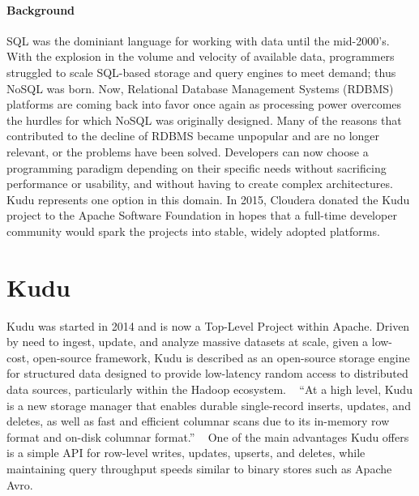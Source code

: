 \paragraph{Background}
SQL was the dominiant language for working with data until the
mid-2000's.  With the explosion in the volume and velocity of
available data, programmers struggled to scale SQL-based storage and
query engines to meet demand; thus NoSQL was born. Now, Relational
Database Management Systems (RDBMS) platforms are coming back into favor once
again as processing power overcomes the hurdles for which NoSQL was
originally designed. Many of the reasons that contributed to the
decline of RDBMS became unpopular and are no longer relevant, or the
problems have been solved. Developers can now choose a programming
paradigm depending on their specific needs without sacrificing
performance or usability, and without having to create complex
architectures.  Kudu represents one option in this domain. In 2015,
Cloudera donated the Kudu project to the Apache Software
Foundation in hopes that a full-time developer community would spark
the projects into stable, widely adopted platforms. ~\cite{hid-sp18-407-cloudera-donates}

\section{Kudu}
Kudu was started in 2014 and is now a Top-Level Project within
Apache. Driven by need to ingest, update, and analyze massive
datasets at scale, given a low-cost, open-source framework, Kudu is
described as an open-source storage engine for structured data
designed to provide low-latency random access to distributed data
sources, particularly within the Hadoop ecosystem. ~\cite{hid-sp18-407-kudu-intro}
``At a high level, Kudu is a new storage manager that enables durable
single-record inserts, updates, and deletes, as well as fast and
efficient columnar scans due to its in-memory row format and on-disk
columnar format.''  ~\cite{hid-sp18-407-kudu-impala-integration}
One of the main advantages Kudu offers is a simple API for row-level
writes, updates, upserts, and deletes, while maintaining query throughput
speeds similar to binary stores such as Apache Avro. ~\cite{hid-sp18-407-kudu-intro} 

